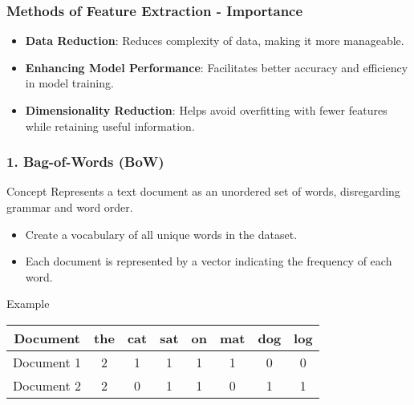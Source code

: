 \documentclass[aspectratio=169]{beamer}
\begin{document}
\begin{frame}[fragile]
    \frametitle{Methods of Feature Extraction - Importance}
    \begin{itemize}
        \item \textbf{Data Reduction}: Reduces complexity of data, making it more manageable.
        \item \textbf{Enhancing Model Performance}: Facilitates better accuracy and efficiency in model training.
        \item \textbf{Dimensionality Reduction}: Helps avoid overfitting with fewer features while retaining useful information.
    \end{itemize}
\end{frame}

\begin{frame}[fragile]
    \frametitle{1. Bag-of-Words (BoW)}
    \begin{block}{Concept}
        Represents a text document as an unordered set of words, disregarding grammar and word order.
    \end{block}
    
    \begin{itemize}
        \item Create a vocabulary of all unique words in the dataset.
        \item Each document is represented by a vector indicating the frequency of each word.
    \end{itemize}
    
    \begin{exampleblock}{Example}
        \begin{tabular}{|c|c|c|c|c|c|c|c|}
            \hline
            Document   & the & cat & sat & on & mat & dog & log \\
            \hline
            Document 1 & 2   & 1   & 1   & 1  & 1   & 0   & 0   \\
            Document 2 & 2   & 0   & 1   & 1  & 0   & 1   & 1   \\
            \hline
        \end{tabular}
    \end{exampleblock}
\end{frame}
\end{document}
